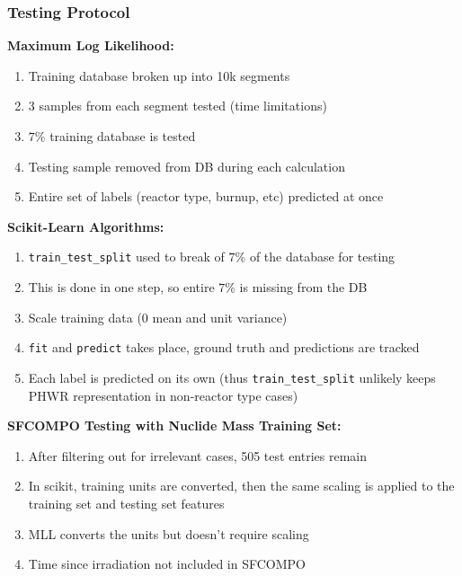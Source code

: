 
\begin{frame}
  \frametitle{Testing Protocol}
  \textbf{Maximum Log Likelihood:}
  \begin{enumerate}
    \footnotesize
    \item Training database broken up into 10k segments
    \item 3 samples from each segment tested (time limitations)
    \item $7\%$ training database is tested
    \item Testing sample removed from DB during each calculation
    \item Entire set of labels (reactor type, burnup, etc) predicted at once
  \end{enumerate}
  \textbf{Scikit-Learn Algorithms:}
  \begin{enumerate}
    \footnotesize
    \item \texttt{train\_test\_split} used to break of $7\%$ of the database for testing
    \item This is done in one step, so entire $7\%$ is missing from the DB 
    \item Scale training data ($0$ mean and unit variance)
    \item \texttt{fit} and \texttt{predict} takes place, ground truth and predictions are tracked
    \item Each label is predicted on its own (thus \texttt{train\_test\_split} unlikely keeps PHWR representation in non-reactor type cases)
  \end{enumerate}
  \textbf{SFCOMPO Testing with Nuclide Mass Training Set:}
  \begin{enumerate}
    \footnotesize
    \item After filtering out for irrelevant cases, 505 test entries remain
    \item In scikit, training units are converted, then the same scaling is applied to the training set and testing set features
    \item MLL converts the units but doesn't require scaling
    \item Time since irradiation not included in SFCOMPO
  \end{enumerate}
\end{frame}

